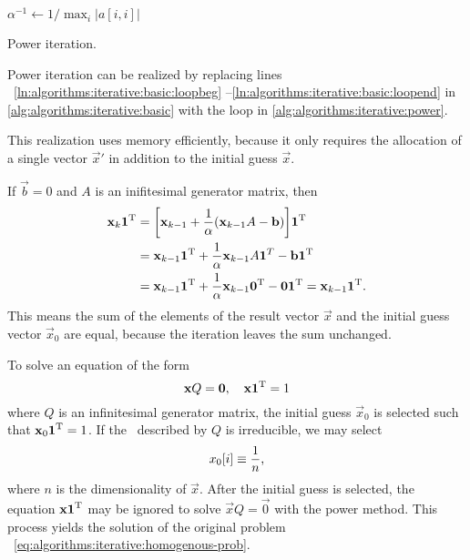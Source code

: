 \begin{algorithm}
  $\alpha^{-1} \gets 1 / \max_{i} \lvert a[i,i] \rvert$\;
  \caption{Power iteration.}
  \label{alg:algorithms:iterative:power}
\end{algorithm}

Power iteration can be realized by replacing lines%
~\ref{ln:algorithms:iterative:basic:loopbeg}%
--\ref{ln:algorithms:iterative:basic:loopend} in
\vref{alg:algorithms:iterative:basic} with the loop in
\vref{alg:algorithms:iterative:power}.

This realization uses memory efficiently, because it only requires the
allocation of a single vector $\vec{x}'$ in addition to the initial
guess $\vec{x}$.

\begin{obs}
  \label{obs:algorithms:iterative:power-keepnorm}
  If $\vec{b} = 0$ and $A$ is an inifitesimal generator matrix, then
  \begin{align}
    \vec{x}_k \vec{1}^\T &= \mleft[ \vec{x}_{k - 1} + \frac{1}{\alpha}
                           \mleft( \vec{x}_{k - 1} A - \vec{b}
                           \mright) \mright] \vec{1}^\T \\
                         &= \vec{x}_{k - 1} \vec{1}^\T +
                           \frac{1}{\alpha} \vec{x}_{k - 1} A
                           \vec{1}^T - \vec{b} \vec{1}^\T \\
                         &= \vec{x}_{k - 1} \vec{1}^\T +
                           \frac{1}{\alpha} \vec{x}_{k - 1} \vec{0}^\T
                           - \vec{0} \vec{1}^\T = \vec{x}_{k - 1} \vec{1}^\T.
  \end{align}
  This means the sum of the elements of the result vector $\vec{x}$
  and the initial guess vector $\vec{x}_0$ are equal, because the
  iteration leaves the sum unchanged.
\end{obs}

To solve an equation of the form
\begin{equation}
  \label{eq:algorithms:iterative:homogenous-prob}
  \bm{\mathrm{x}} Q = \bm{\mathrm{0}},\quad \bm{\mathrm{x}} \bm{\mathrm{1}}^{\mathrm{T}} = 1
\end{equation}
where $Q$ is an infinitesimal generator matrix, the initial guess
$\vec{x}_0$ is selected such that $\bm{\mathrm{x}}_0 \bm{\mathrm{1}}^{\mathrm{T}} = 1$. If the
\CTMC\ described by $Q$ is irreducible, we may select
\begin{equation}
  \label{eq:algorithms:iterative:power-init}
  x_0[i] \equiv \frac{1}{n} \text,
\end{equation}
where $n$ is the dimensionality of $\vec{x}$. After the initial guess
is selected, the equation $\bm{\mathrm{x}} \bm{\mathrm{1}}^{\mathrm{T}}$ may be ignored to solve
$\vec{x} Q = \vec{0}$ with the power method. This process yields the
solution of the original problem%
~\eqref{eq:algorithms:iterative:homogenous-prob}.

